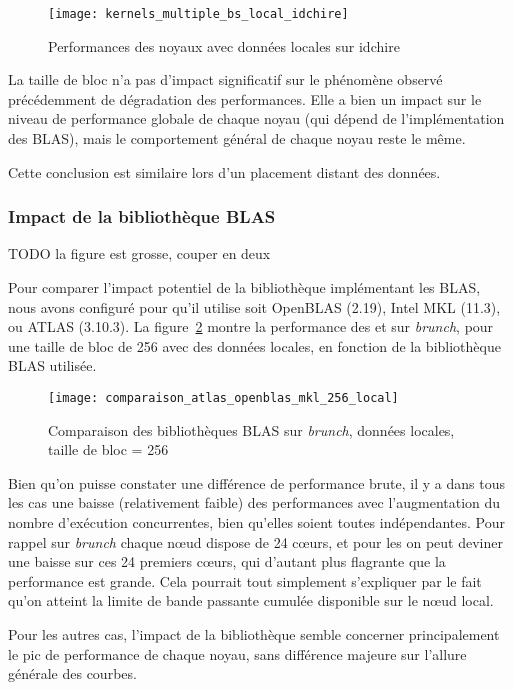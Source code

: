 \begin{figure}[ht]
  \centering
  \texttt{[image: kernels\_multiple\_bs\_local\_idchire]}
  \caption{Performances des noyaux avec données locales sur idchire}\label{fig:contribs:apps:cholesky:perf-multiple-bs-idchire}
\end{figure}

La taille de bloc n'a pas d'impact significatif sur le phénomène observé précédemment de dégradation des performances.
Elle a bien un impact sur le niveau de performance globale de chaque noyau (qui dépend de l'implémentation des BLAS), mais le comportement général de chaque noyau reste le même.

Cette conclusion est similaire lors d'un placement distant des données.


\subsubsection{Impact de la bibliothèque BLAS}

TODO la figure est grosse, couper en deux

Pour comparer l'impact potentiel de la bibliothèque implémentant les BLAS, nous avons configuré \outil pour qu'il utilise soit OpenBLAS (2.19), Intel MKL (11.3), ou ATLAS (3.10.3).
La figure~\ref{fig:contribs:apps:cholesky:perf-blas} montre la performance des \gemm et \potrf sur \emph{brunch}, pour une taille de bloc de 256 avec des données locales, en fonction de la bibliothèque BLAS utilisée.

\begin{figure}[ht]
  \centering
  \texttt{[image: comparaison\_atlas\_openblas\_mkl\_256\_local]}
  \caption{Comparaison des bibliothèques BLAS sur \emph{brunch}, données locales, taille de bloc = 256}\label{fig:contribs:apps:cholesky:perf-blas}
\end{figure}

Bien qu'on puisse constater une différence de performance brute, il y a dans tous les cas une baisse (relativement faible) des performances avec l'augmentation du nombre d'exécution concurrentes, bien qu'elles soient toutes indépendantes.
Pour rappel sur \emph{brunch} chaque nœud dispose de 24 cœurs, et pour les \gemm on peut deviner une baisse sur ces 24 premiers cœurs, qui d'autant plus flagrante que la performance est grande.
Cela pourrait tout simplement s'expliquer par le fait qu'on atteint la limite de bande passante cumulée disponible sur le nœud local.

Pour les autres cas, l'impact de la bibliothèque semble concerner principalement le pic de performance de chaque noyau, sans différence majeure sur l'allure générale des courbes.

